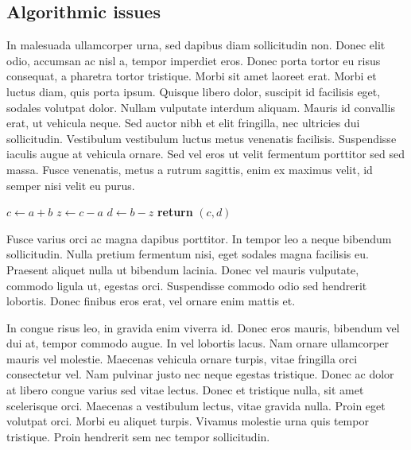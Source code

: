 \documentclass{article}
\begin{document}

\subsection{Algorithmic issues}

In malesuada ullamcorper urna, sed dapibus diam sollicitudin non. Donec elit odio, accumsan ac nisl a, tempor imperdiet eros. Donec porta tortor eu risus consequat, a pharetra tortor tristique. Morbi sit amet laoreet erat. Morbi et luctus diam, quis porta ipsum. Quisque libero dolor, suscipit id facilisis eget, sodales volutpat dolor. Nullam vulputate interdum aliquam. Mauris id convallis erat, ut vehicula neque. Sed auctor nibh et elit fringilla, nec ultricies dui sollicitudin. Vestibulum vestibulum luctus metus venenatis facilisis. Suspendisse iaculis augue at vehicula ornare. Sed vel eros ut velit fermentum porttitor sed sed massa. Fusce venenatis, metus a rutrum sagittis, enim ex maximus velit, id semper nisi velit eu purus.

\begin{center}
	\begin{minipage}{0.5\linewidth} %
		\begin{algorithm}[H]
			\medskip
			$c \leftarrow a + b$ \;
			$z \leftarrow c - a$ \;
			$d \leftarrow b - z$ \;
			{\bf return} $(c,d)$ \;
			\caption{\texttt{FastTwoSum}} %
			\label{alg:fastTwoSum}   %
		\end{algorithm}
	\end{minipage}
\end{center}

Fusce varius orci ac magna dapibus porttitor. In tempor leo a neque bibendum sollicitudin. Nulla pretium fermentum nisi, eget sodales magna facilisis eu. Praesent aliquet nulla ut bibendum lacinia. Donec vel mauris vulputate, commodo ligula ut, egestas orci. Suspendisse commodo odio sed hendrerit lobortis. Donec finibus eros erat, vel ornare enim mattis et.

\begin{question}
	In congue risus leo, in gravida enim viverra id. Donec eros mauris, bibendum vel dui at, tempor commodo augue. In vel lobortis lacus. Nam ornare ullamcorper mauris vel molestie. Maecenas vehicula ornare turpis, vitae fringilla orci consectetur vel. Nam pulvinar justo nec neque egestas tristique. Donec ac dolor at libero congue varius sed vitae lectus. Donec et tristique nulla, sit amet scelerisque orci. Maecenas a vestibulum lectus, vitae gravida nulla. Proin eget volutpat orci. Morbi eu aliquet turpis. Vivamus molestie urna quis tempor tristique. Proin hendrerit sem nec tempor sollicitudin.
\end{question}
\end{document}
